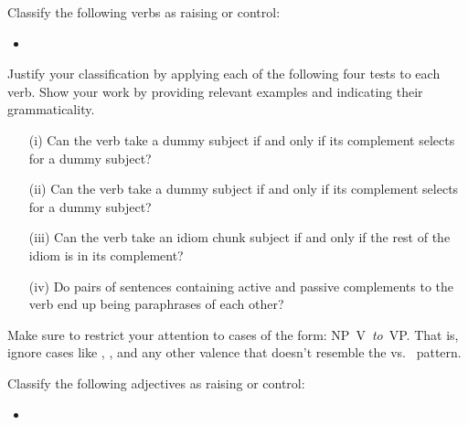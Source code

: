 \documentclass[a4paper,landscape,headrule,footrule,dvips]{foils}
\begin{document}

\noindent Classify the following verbs as raising or control:

\begin{itemize}
\item {}
\end{itemize}

\noindent
Justify your classification by applying each of the following four
tests to each verb.  Show your work by providing relevant examples
and indicating their grammaticality. 

\begin{itemize} 
\item[(i)] Can the verb take a  dummy  subject if and only if its complement selects for a dummy  subject?

\item[(ii)] Can the verb take a dummy  subject if and only if
  its complement selects for a dummy  subject?

\item[(iii)] Can the verb take an idiom chunk subject if and only
if the rest of the idiom is in its complement?

\item[(iv)] Do pairs of sentences containing active and 
passive complements to the verb end up being  paraphrases 
of each other?
\end{itemize}

\noindent
Make sure to restrict your attention to cases of the form: \hbox{NP V
  {\it to} VP}. That is, ignore cases like ,
, and any other valence that doesn't resemble
the  vs.\  pattern.

Classify the following adjectives as raising or 
control:

\begin{itemize}
\item {}
\end{itemize}
\end{document}
